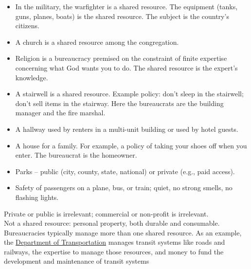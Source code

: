 {{\begin{itemize}
\item In the military, the warfighter is a shared resource. The equipment (tanks, guns, planes, boats) is the shared resource. The subject is the country's citizens. 
\item A church is a shared resource among the congregation.
\item Religion is a bureaucracy premised on the constraint of finite expertise concerning what God wants you to do. The shared resource is the expert's knowledge.
\item A stairwell is a shared resource. Example policy: don't sleep in the stairwell; don't sell items in the stairway. Here the bureaucrats are the building manager and the fire marshal. 
\item A hallway used by renters in a multi-unit building or used by hotel guests.
\item A house for a family. For example, a policy of taking your shoes off when you enter. The bureaucrat is the homeowner.
\item Parks -- public (city, county, state, national) or private (e.g., paid access). 
\item Safety of passengers on a plane, bus, or train; quiet, no strong smells, no flashing lights.
\end{itemize}
Private or public is irrelevant; commercial or non-profit is irrelevant. \\
Not a shared resource: personal property, both durable and consumable. \\
Bureaucracies typically manage more than one shared resource.
As an example, the \href{https://en.wikipedia.org/wiki/Department_of_transportation}{Department of Transportation}
manages  transit systems like roads and railways, the expertise to manage those resources, and money to fund the development and maintenance of transit systems}
}



